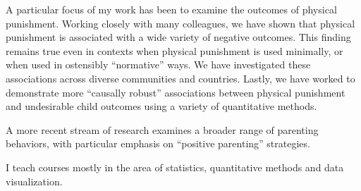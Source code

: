 \documentclass[
  letterpaper,
  DIV=11,
  numbers=noendperiod]{scrreprt}
\begin{document}
A particular focus of my work has been to examine the outcomes of
physical punishment. Working closely with many colleagues, we have shown
that physical punishment is associated with a wide variety of negative
outcomes. This finding remains true even in contexts when physical
punishment is used minimally, or when used in ostensibly ``normative''
ways. We have investigated these associations across diverse communities
and countries. Lastly, we have worked to demonstrate more ``causally
robust'' associations between physical punishment and undesirable child
outcomes using a variety of quantitative methods.

A more recent stream of research examines a broader range of parenting
behaviors, with particular emphasis on ``positive parenting''
strategies.

I teach courses mostly in the area of statistics, quantitative methods
and data visualization.



\printindex
\end{document}

